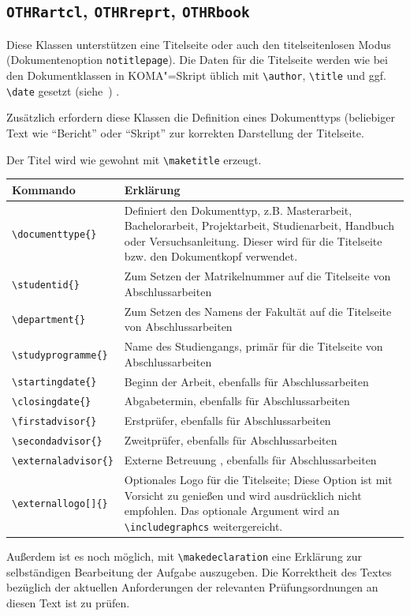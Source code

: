 \subsection{\texttt{OTHRartcl}, \texttt{OTHRreprt}, \texttt{OTHRbook}}

Diese Klassen unterstützen eine Titelseite oder auch den titelseitenlosen Modus (Dokumentenoption \verb|notitlepage|).
Die Daten für die Titelseite werden wie bei den Dokumentklassen in KOMA"=Skript üblich mit \verb|\author|, \verb|\title| und ggf. \verb|\date| gesetzt (siehe~\cite{KOMA}) .

Zusätzlich erfordern diese Klassen die Definition eines Dokumenttyps (beliebiger Text wie \enquote{Bericht} oder \enquote{Skript} zur korrekten Darstellung der Titelseite.

Der Titel wird wie gewohnt mit \verb|\maketitle| erzeugt.

\begin{center}
\begin{tabularx}{.9\linewidth}{lX}\toprule
\textbf{Kommando} & \textbf{Erklärung} \\\midrule
\verb+\documenttype{}+ & Definiert den Dokumenttyp, z.B. Masterarbeit, Bachelorarbeit, Projektarbeit, Studienarbeit, Handbuch oder Versuchsanleitung.
Dieser wird für die Titelseite bzw. den Dokumentkopf verwendet.\\
\verb+\studentid{}+ & Zum Setzen der Matrikelnummer auf die Titelseite von Abschlussarbeiten\\
\verb+\department{}+ & Zum Setzen des Namens der Fakultät auf die Titelseite von Abschlussarbeiten\\
\verb+\studyprogramme{}+ & Name des Studiengangs, primär für die Titelseite von Abschlussarbeiten\\
\verb+\startingdate{}+ & Beginn der Arbeit, ebenfalls für Abschlussarbeiten\\
\verb+\closingdate{}+ & Abgabetermin, ebenfalls für Abschlussarbeiten\\
\verb+\firstadvisor{}+ & Erstprüfer, ebenfalls für Abschlussarbeiten\\
\verb+\secondadvisor{}+ & Zweitprüfer, ebenfalls für Abschlussarbeiten\\
\verb+\externaladvisor{}+ & Externe Betreuung , ebenfalls für Abschlussarbeiten\\
\verb+\externallogo[]{}+ & Optionales Logo für die Titelseite; Diese Option ist mit Vorsicht zu genießen und wird ausdrücklich nicht empfohlen. Das optionale Argument wird an \verb|\includegraphcs| weitergereicht.\\
\bottomrule
\end{tabularx}
\end{center}
Außerdem ist es noch möglich, mit \verb|\makedeclaration| eine Erklärung zur selbständigen Bearbeitung der Aufgabe auszugeben.
Die Korrektheit des Textes bezüglich der aktuellen Anforderungen der relevanten  Prüfungsordnungen an diesen Text ist zu prüfen.

